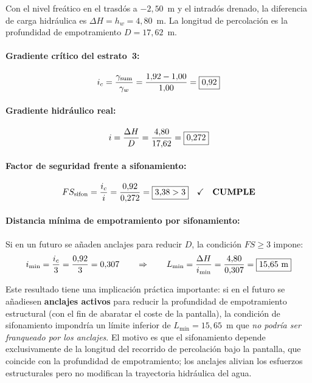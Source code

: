 Con el nivel freático en el trasdós a $-2{,}50$~m y el intradós drenado, la
diferencia de carga hidráulica es $\Delta H = h_w = 4{,}80$~m. La longitud
de percolación es la profundidad de empotramiento $D = 17{,}62$~m.

\paragraph{Gradiente crítico del estrato~3:}
\begin{equation}
  i_c = \frac{\gamma_{\mathrm{sum}}}{\gamma_w}
      = \frac{1{,}92 - 1{,}00}{1{,}00}
      = \boxed{0{,}92}
\end{equation}

\paragraph{Gradiente hidráulico real:}
\begin{equation}
  i = \frac{\Delta H}{D} = \frac{4{,}80}{17{,}62} = \boxed{0{,}272}
\end{equation}

\paragraph{Factor de seguridad frente a sifonamiento:}
\begin{equation}
  FS_{\mathrm{sifon}} = \frac{i_c}{i} = \frac{0{,}92}{0{,}272}
  = \boxed{3{,}38 > 3} \quad\checkmark \quad \textbf{CUMPLE}
  \label{eq:fs_sifonamiento}
\end{equation}

\paragraph{Distancia mínima de empotramiento por sifonamiento:}

Si en un futuro se añaden anclajes para reducir $D$, la condición
$FS \geq 3$ impone:
\[
  i_{\min} = \frac{i_c}{3} = \frac{0{,}92}{3} = 0{,}307
  \qquad\Rightarrow\qquad
  L_{\min} = \frac{\Delta H}{i_{\min}} = \frac{4{,}80}{0{,}307}
  = \boxed{15{,}65~\text{m}}
\]

Este resultado tiene una implicación práctica importante: si en el futuro se
añadiesen \textbf{anclajes activos} para reducir la profundidad de empotramiento
estructural (con el fin de abaratar el coste de la pantalla), la condición de
sifonamiento impondría un límite inferior de $L_\text{mín} = 15{,}65$~m que
\emph{no podría ser franqueado por los anclajes}. El motivo es que el sifonamiento
depende exclusivamente de la longitud del recorrido de percolación bajo la
pantalla, que coincide con la profundidad de empotramiento; los anclajes alivian
los esfuerzos estructurales pero no modifican la trayectoria hidráulica del agua.

